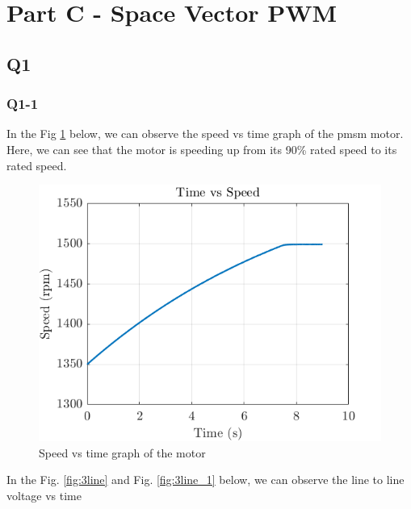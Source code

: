\section{Part C - Space Vector PWM}
\subsection{Q1}
\subsubsection{Q1-1}

In the Fig \ref{fig:s2} below, we can observe the speed vs time graph of the pmsm motor. Here, we can see that the motor is speeding up from its 90\% rated speed to its rated speed. 

\begin{center}
\begin{figure}[H]
\centering
\includegraphics [width = 10 cm]{figs/speed.png}
\caption{Speed vs time graph of the motor}
\label{fig:s2}
\end{figure}
\end{center}

In the Fig. \ref{fig:3line} and Fig. \ref{fig:3line_1} below, we can observe the line to line voltage vs time

